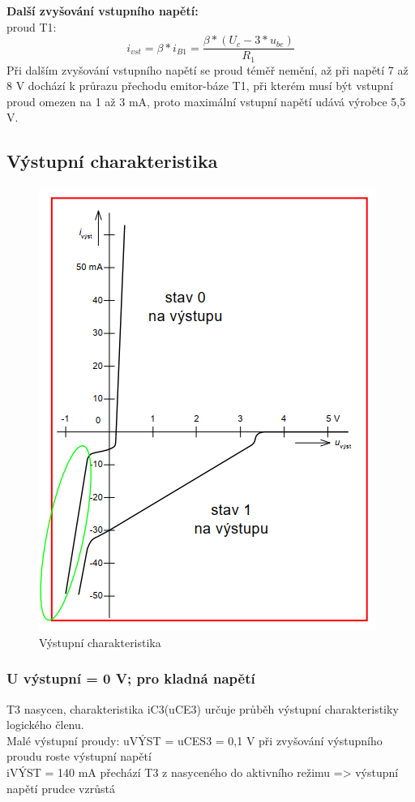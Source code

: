 \textbf{Další zvyšování vstupního napětí:}\\
proud T1:
\begin{equation}
i_{vst} = \beta*i_{B1} = \frac{\beta*(U_{c}-3*u_{be})}{R_{1}}
\end{equation}
Při dalším zvyšování vstupního napětí se proud téměř nemění, až při napětí 7 až 8 V
dochází k průrazu přechodu emitor-báze T1, při kterém musí být vstupní proud omezen na
1 až 3 mA, proto maximální vstupní napětí udává výrobce 5,5 V.
\newpage
 \subsection{Výstupní charakteristika}
     \begin{figure}[h]
   \begin{center}
     \includegraphics[scale=0.6]{images/Vystup.png}
   \end{center}
   \caption{Výstupní charakteristika}
  \end{figure}

\subsubsection{U výstupní = 0 V; pro kladná napětí}
T3 nasycen, charakteristika iC3(uCE3) určuje průběh výstupní charakteristiky logického členu.\\
Malé výstupní proudy: uVÝST = uCES3 = 0,1 V při zvyšování výstupního proudu roste výstupní napětí\\
iVÝST = 140 mA přechází T3 z nasyceného do aktivního režimu => výstupní napětí prudce vzrůstá
